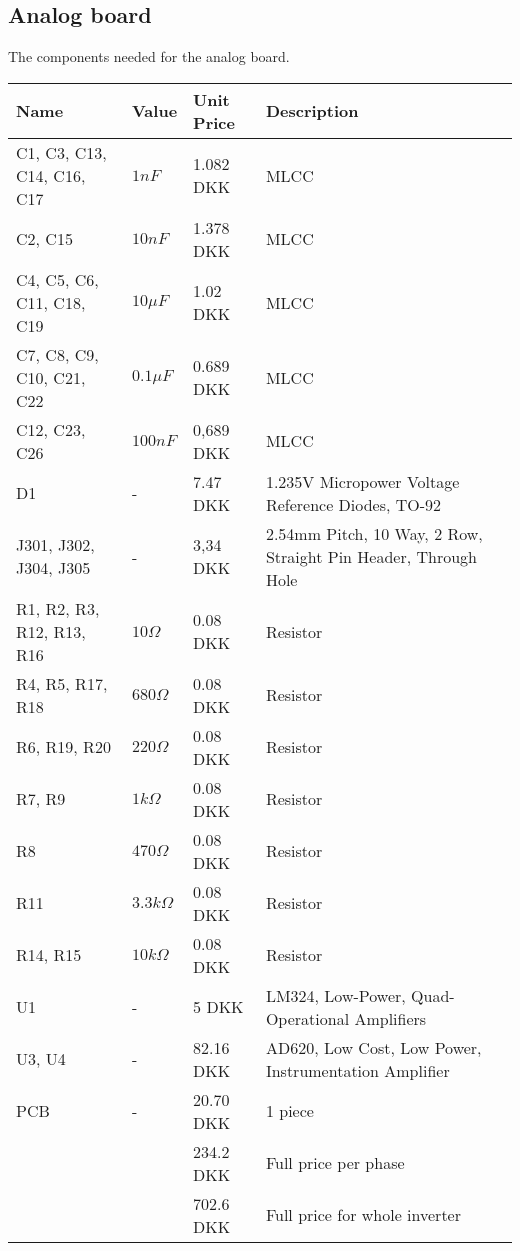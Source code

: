 \subsection{Analog board}
The components needed for the analog board.
\begin{table}[H]
\centering
\footnotesize
\begin{tabular}{|p{4cm} p{1.5cm} p{2.2cm} p{6cm}|} \hline
\textbf{Name}              & \textbf{Value} & \textbf{Unit Price}    & \textbf{Description} \\ \hline
C1, C3, C13, C14, C16, C17 & $1nF$          & 1.082 DKK          &     MLCC  \\
C2, C15                    & $10nF$         & 1.378 DKK          &     MLCC  \\
C4, C5, C6, C11, C18, C19  & $10\mu F$      & 1.02 DKK          &     MLCC  \\
C7, C8, C9, C10, C21, C22  & $0.1\mu F$     & 0.689 DKK           &     MLCC \\
C12, C23, C26              & $100nF$        & 0,689 DKK          &     MLCC  \\
D1                         & -              & 7.47 DKK & 1.235V Micropower Voltage Reference Diodes, TO-92   \\
J301, J302, J304, J305     &  -             & 3,34 DKK & 2.54mm Pitch, 10 Way, 2 Row, Straight Pin Header, Through Hole \\
R1, R2, R3, R12, R13, R16  & $10 \Omega$    & 0.08 DKK& Resistor  \\
R4, R5, R17, R18           & $680 \Omega$   & 0.08 DKK& Resistor  \\
R6, R19, R20               & $220 \Omega$   & 0.08 DKK& Resistor  \\
R7, R9                     & $1k \Omega$    & 0.08 DKK& Resistor  \\
R8                         & $470 \Omega$   & 0.08 DKK& Resistor  \\
R11                        & $3.3k \Omega$  & 0.08 DKK& Resistor  \\
R14, R15                   & $10k \Omega$   & 0.08 DKK& Resistor \\
U1                         & -              & 5    DKK& LM324, Low-Power, Quad-Operational Amplifiers       \\
U3, U4                     & -              & 82.16 DKK& AD620, Low Cost, Low Power, Instrumentation Amplifier \\ 
PCB               & -                  & 20.70 DKK  & 1 piece         \\ \hline
& & 234.2 DKK & Full price per phase \\ \hline
& & 702.6 DKK & Full price for whole inverter \\ \hline
\end{tabular}
\end{table}



